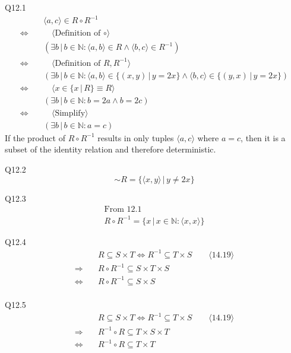 \documentclass{article}
\begin{document}
    \vspace{10mm}
    Q12.1
    \begin{align*}
        & \quad \langle a,c\rangle\in R\circ R^{-1} \\
        \Longleftrightarrow & \qquad \langle \text{Definition of } \circ \rangle \\
        & \quad (\exists b\,|\,b\in\mathbb{N}:\langle a,b\rangle\in R \land \langle b,c\rangle\in R^{-1}) \\
        \Longleftrightarrow & \qquad \langle \text{Definition of } R, R^{-1} \rangle \\
        & \quad (\exists b\,|\,b\in\mathbb{N}:\langle a,b\rangle\in \{(x,y)\,|\,y=2x\} \land \langle b,c\rangle\in \{(y,x)\,|\,y=2x\}) \\
        \Longleftrightarrow & \qquad \langle x\in\{x\,|\,R\} \equiv R \rangle \\
        & \quad (\exists b\,|\,b\in\mathbb{N}:b=2a\land b=2c) \\
        \Longleftrightarrow & \qquad \langle \text{Simplify} \rangle \\
        & \quad (\exists b\,|\,b\in\mathbb{N}:a=c)
    \end{align*}
    If the product of $R \circ R^{-1}$ results in only tuples $\langle a,c\rangle$ where $a=c$, then it is a subset of the identity relation and therefore deterministic. 
    
    \vspace{5mm}
    Q12.2
    \begin{equation*}
    \sim R = \{\langle x,y\rangle\,|\, y \neq 2x\}
    \end{equation*}

    \vspace{5mm}
    Q12.3
    \begin{gather*}
        \text{From 12.1} \\
        R\circ R^{-1} = \{x\,|\, x\in\mathbb{N}:\langle x,x\rangle\}
    \end{gather*}
    
    \vspace{5mm}
    Q12.4
    \begin{align*}
        & \quad R\subseteq S\times T \Longleftrightarrow R^{-1} \subseteq T\times S \qquad \langle 14.19\rangle \\ 
        \Longrightarrow & \quad R\circ R^{-1} \subseteq S\times T\times S \\
        \Longleftrightarrow & \quad R\circ R^{-1} \subseteq S\times S \\
    \end{align*}

    \vspace{5mm}
    Q12.5
    \begin{align*}
        & \quad R\subseteq S\times T \Longleftrightarrow R^{-1} \subseteq T\times S \qquad \langle 14.19\rangle \\ 
        \Longrightarrow & \quad R^{-1}\circ R \subseteq T\times S\times T \\
        \Longleftrightarrow & \quad R^{-1}\circ R \subseteq T\times T \\
    \end{align*}
     
\end{document}
